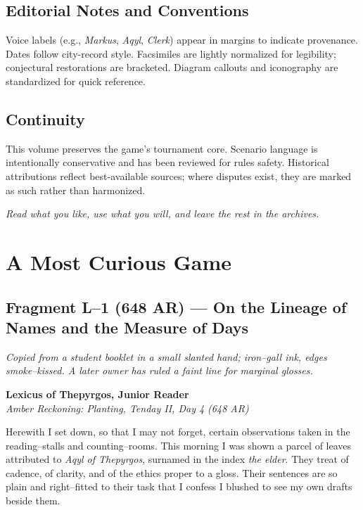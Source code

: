 \documentclass[11pt]{article}
\numberwithin{equation}{section} %
\theoremstyle{plain} %
\theoremstyle{definition} %
\theoremstyle{remark} %
\begin{document}
\subsection{Editorial Notes and Conventions}
Voice labels (e.g., \emph{Markus}, \emph{Aqyl}, \emph{Clerk}) appear in margins to indicate provenance. Dates follow city-record style. Facsimiles are lightly normalized for legibility; conjectural restorations are bracketed. Diagram callouts and iconography are standardized for quick reference.

\subsection{Continuity}
This volume preserves the game's tournament core. Scenario language is intentionally conservative and has been reviewed for rules safety. Historical attributions reflect best-available sources; where disputes exist, they are marked as such rather than harmonized.

\medskip
\noindent\textit{Read what you like, use what you will, and leave the rest in the archives.}

\clearpage
{}

\section{A Most Curious Game}
\label{sec:curious-game}

\subsection{Fragment L--1 (648 AR) --- On the Lineage of Names and the Measure of Days}
\label{frag:l1}

\noindent\textit{Copied from a student booklet in a small slanted hand; iron--gall ink, edges smoke--kissed. A later owner has ruled a faint line for marginal glosses.}

\medskip
\noindent\textbf{Lexicus of Thepyrgos, Junior Reader}\\
\textit{Amber Reckoning: Planting, Tenday II, Day 4 (648 AR)}

Herewith I set down, so that I may not forget, certain observations taken in the reading--stalls and counting--rooms. This morning I was shown a parcel of leaves attributed to \textit{Aqyl of Thepyrgos}, surnamed in the index \textit{the elder}. They treat of cadence, of clarity, and of the ethics proper to a gloss. Their sentences are so plain and right--fitted to their task that I confess I blushed to see my own drafts beside them.
\end{document}
